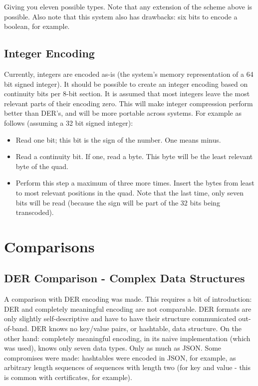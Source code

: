Giving you eleven possible types. Note that any extension of the scheme
above is possible. Also note that this system also has drawbacks:
six bits to encode a boolean, for example.



\subsection{Integer Encoding}

Currently, integers are encoded as-is (the system's memory representation
of a 64 bit signed integer).
It should be possible to
create an integer encoding based on continuity bits per 8-bit section.
It is assumed
that most integers leave the most relevant parts of their encoding zero.
This will make integer compression perform better
than DER's, and will be more portable across systems.
For example as follows (assuming a 32 bit signed integer):

\begin{itemize}
\item Read one bit; this bit is the sign of the number. One means minus.
\item Read a continuity bit. If one, read a byte. This byte will be the
      least relevant byte of the quad.
\item Perform this step a maximum of three more times. Insert the bytes
      from least to most relevant positions in the quad. Note that the
      last time, only seven bits will be read (because the sign will be
      part of the 32 bits being transcoded).
\end{itemize}

%

\section{Comparisons}

\subsection{DER Comparison - Complex Data Structures}

A comparison with DER encoding was made. This requires a bit of
introduction: DER and completely meaningful encoding
are not comparable. DER formats
are only slightly self-descriptive and have to have their structure
communicated
out-of-band. DER knows no key/value pairs, or hashtable, data structure.
On the other hand: completely meaningful encoding, in its naive
implementation (which was used), knows only seven data types.
Only as much as JSON. Some compromises were made: hashtables were
encoded in JSON, for example, as arbitrary length sequences of
sequences with length two (for key and value - this is common with
certificates, for example).

